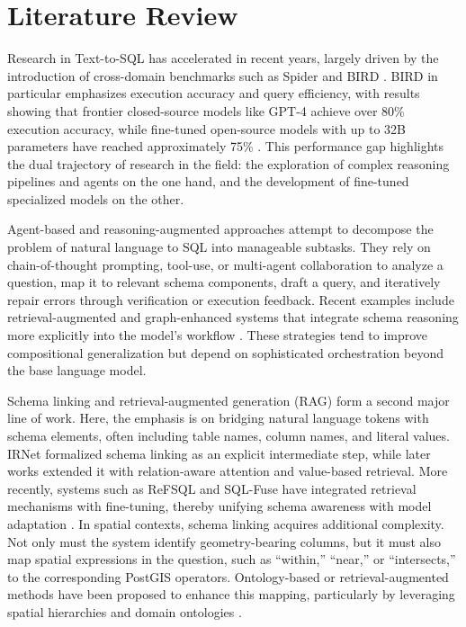 \section{Literature Review}
\label{sec:lit}

Research in Text-to-SQL has accelerated in recent years, largely driven by the introduction of cross-domain benchmarks such as Spider and BIRD \cite{bird}. BIRD in particular emphasizes execution accuracy and query efficiency, with results showing that frontier closed-source models like GPT-4 achieve over 80\% execution accuracy, while fine-tuned open-source models with up to 32B parameters have reached approximately 75\% \cite{survey_llm_t2sql_liu2025,survey_llm_t2sql_huang2025}. This performance gap highlights the dual trajectory of research in the field: the exploration of complex reasoning pipelines and agents on the one hand, and the development of fine-tuned specialized models on the other.

Agent-based and reasoning-augmented approaches attempt to decompose the problem of natural language to SQL into manageable subtasks. They rely on chain-of-thought prompting, tool-use, or multi-agent collaboration to analyze a question, map it to relevant schema components, draft a query, and iteratively repair errors through verification or execution feedback. Recent examples include retrieval-augmented and graph-enhanced systems that integrate schema reasoning more explicitly into the model’s workflow \cite{refsql,sqlfuse,grafix_t5,omnisql}. These strategies tend to improve compositional generalization but depend on sophisticated orchestration beyond the base language model.

Schema linking and retrieval-augmented generation (RAG) form a second major line of work. Here, the emphasis is on bridging natural language tokens with schema elements, often including table names, column names, and literal values. IRNet \cite{irnet} formalized schema linking as an explicit intermediate step, while later works extended it with relation-aware attention and value-based retrieval. More recently, systems such as ReFSQL and SQL-Fuse have integrated retrieval mechanisms with fine-tuning, thereby unifying schema awareness with model adaptation \cite{refsql,sqlfuse}. In spatial contexts, schema linking acquires additional complexity. Not only must the system identify geometry-bearing columns, but it must also map spatial expressions in the question, such as “within,” “near,” or “intersects,” to the corresponding PostGIS operators. Ontology-based or retrieval-augmented methods have been proposed to enhance this mapping, particularly by leveraging spatial hierarchies and domain ontologies \cite{spatial_rag,opensql}.

